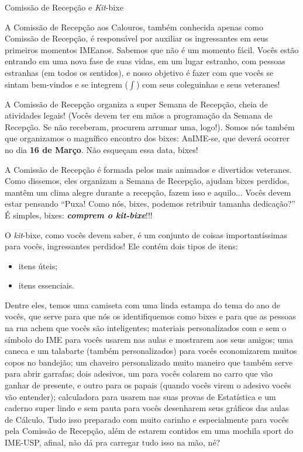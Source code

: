 \begin{secao}{Comissão de Recepção e \textit{Kit}-bixe}

A Comissão de Recepção aos Calouros, também conhecida apenas como Comissão de 
Recepção, é responsável por auxiliar os ingressantes em seus primeiros momentos 
IMEanos. Sabemos que não é um momento fácil. Vocês estão entrando em uma nova fase 
de suas vidas, em um lugar estranho, com pessoas estranhas (em todos os sentidos),
e nosso objetivo é fazer com que vocês se sintam bem-vindos e se integrem
($\int$) com seus coleguinhas e seus veteranes!

A Comissão de Recepção organiza a super Semana de Recepção, cheia de atividades
legais! (Vocês devem ter em mãos a programação da Semana de Recepção. 
Se não receberam, procurem arrumar uma, logo!).
Somos nós também que organizamos o magnífico encontro dos bixes: AnIME-se, que 
deverá ocorrer no dia \textbf{16 de Março}. Não esqueçam essa data, bixes! %

A Comissão de Recepção é formada pelos mais animados e divertidos veteranes. Como
dissemos, eles organizam a Semana de Recepção, ajudam bixes perdidos, mantêm um clima
alegre durante a recepção, fazem isso e aquilo...
Vocês devem estar pensando ``Puxa! Como nós, bixes, podemos retribuir
tamanha dedicação?'' É simples, bixes: {\bf\em comprem o \textit{kit}-bixe}!!!

O \textit{kit}-bixe, como vocês devem saber, é um conjunto de coisas
importantíssimas para vocês, ingressantes perdidos! Ele contém dois tipos de
itens:
\begin{itemize}
\item itens úteis;
\item itens essenciais.
\end{itemize} %
Dentre eles, temos uma camiseta com uma linda estampa do tema do ano de vocês,
que serve para que nós os identifiquemos como bixes e para que as pessoas na 
rua achem que vocês são inteligentes; materiais personalizados com e sem o símbolo do IME para 
vocês usarem nas aulas e mostrarem aos seus amigos; uma caneca e um talabarte
(também personalizados) para vocês economizarem muitos copos no bandejão; um
chaveiro personalizado muito maneiro que também serve para abrir garrafas;
dois adesivos, um para vocês colarem no carro que vão ganhar de presente, e outro
para os papais (quando vocês virem o adesivo vocês vão entender); calculadora para 
usarem nas suas provas de Estatística e um caderno super
lindo e sem pauta para vocês desenharem seus gráficos das aulas de Cálculo. Tudo
isso preparado com muito carinho e especialmente para vocês pela Comissão de Recepção,
além de estarem contidos em uma mochila sport do IME-USP, afinal, não dá pra
carregar tudo isso na mão, né?


\end{secao}
